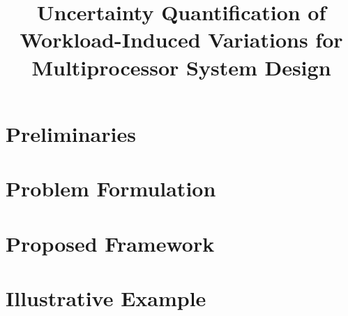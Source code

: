 \documentclass{sig-alternate}
\begin{document}
  \title{Uncertainty Quantification of Workload-Induced Variations for Multiprocessor System Design}

  \maketitle

  \begin{abstract}
    
  \end{abstract}

  \section{Preliminaries}
  

  \section{Problem Formulation}
  

  \section{Proposed Framework}
  

  \section{Illustrative Example}
  

  \printbibliography

  \appendix
  
\end{document}
